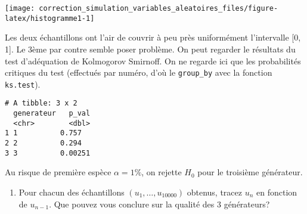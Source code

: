 \documentclass[
]{article}
\newenvironment{Shaded}{\begin{snugshade}}{\end{snugshade}}
\newcommand{\AttributeTok}[1]{\textcolor[rgb]{0.77,0.63,0.00}{#1}}
\newcommand{\CommentTok}[1]{\textcolor[rgb]{0.56,0.35,0.01}{\textit{#1}}}
\newcommand{\FunctionTok}[1]{\textcolor[rgb]{0.00,0.00,0.00}{#1}}
\newcommand{\NormalTok}[1]{#1}
\newcommand{\OtherTok}[1]{\textcolor[rgb]{0.56,0.35,0.01}{#1}}
\newcommand{\SpecialCharTok}[1]{\textcolor[rgb]{0.00,0.00,0.00}{#1}}
\newcommand{\StringTok}[1]{\textcolor[rgb]{0.31,0.60,0.02}{#1}}
\providecommand{\tightlist}{%
  \setlength{\itemsep}{0pt}\setlength{\parskip}{0pt}}
\newenvironment{Correction}%
  { \vspace{\baselineskip}\begin{mdframed}[backgroundcolor=my_green]}%
  {\end{mdframed}}
\begin{document}
\begin{center}\texttt{[image: correction\_simulation\_variables\_aleatoires\_files/figure-latex/histogramme1-1]} \end{center}

\begin{Correction}

Les deux échantillons ont l'air de couvrir à peu près uniformément l'intervalle [0, 1].
Le 3ème par contre semble poser problème.
On peut regarder le résultats du test d'adéquation de Kolmogorov Smirnoff.
On ne regarde ici que les probabilités critiques du test (effectués par numéro, d'où le \texttt{group_by} avec la fonction \texttt{ks.test}).

\end{Correction}

\begin{Shaded}
\end{Shaded}

\begin{verbatim}
# A tibble: 3 x 2
  generateur   p_val
  <chr>        <dbl>
1 1          0.757  
2 2          0.294  
3 3          0.00251
\end{verbatim}

\begin{Correction}

Au risque de première espèce $\alpha = 1\%$, on rejette $H_0$ pour le troisième générateur.

\end{Correction}

\begin{enumerate}
\def\labelenumi{\arabic{enumi}.}
\setcounter{enumi}{3}
\tightlist
\item
  Pour chacun des échantillons \((u_1,\dots, u_{10000})\) obtenus,
  tracez \(u_n\) en fonction de \(u_{n-1}\). Que pouvez vous conclure
  sur la qualité des 3 générateurs?
\end{enumerate}
\end{document}
